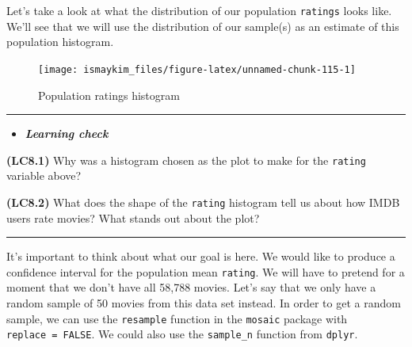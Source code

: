 \documentclass[]{tufte-book}
\newenvironment{Shaded}{\begin{snugshade}}{\end{snugshade}}
\newcommand{\KeywordTok}[1]{\textcolor[rgb]{0.13,0.29,0.53}{\textbf{{#1}}}}
\newcommand{\DataTypeTok}[1]{\textcolor[rgb]{0.13,0.29,0.53}{{#1}}}
\newcommand{\DecValTok}[1]{\textcolor[rgb]{0.00,0.00,0.81}{{#1}}}
\newcommand{\StringTok}[1]{\textcolor[rgb]{0.31,0.60,0.02}{{#1}}}
\newcommand{\NormalTok}[1]{{#1}}
\let\oldrule=\rule
\renewcommand{\rule}[1]{\oldrule{\linewidth}}
\newenvironment{rmdblock}[1]
  {\begin{shaded*}
  \begin{itemize}
  \renewcommand{\labelitemi}{
    \raisebox{-.7\height}[0pt][0pt]{
    }
  }
  \item
  }
  {
  \end{itemize}
  \end{shaded*}
  }
\newenvironment{learncheck}
  {\begin{rmdblock}{warning}}
  {\end{rmdblock}}
\begin{document}
Let's take a look at what the distribution of our population
\texttt{ratings} looks like. We'll see that we will use the distribution
of our sample(s) as an estimate of this population histogram.

\begin{Shaded}
\end{Shaded}

\begin{figure}

{\centering \texttt{[image: ismaykim\_files/figure-latex/unnamed-chunk-115-1]} 

}

\caption[Population ratings histogram]{Population ratings histogram}\label{fig:unnamed-chunk-115}
\end{figure}

\begin{center}\rule{0.5\linewidth}{\linethickness}\end{center}

\begin{learncheck}
\textbf{\emph{Learning check}}
\end{learncheck}

\textbf{(LC8.1)} Why was a histogram chosen as the plot to make for the
\texttt{rating} variable above?

\textbf{(LC8.2)} What does the shape of the \texttt{rating} histogram
tell us about how IMDB users rate movies? What stands out about the
plot?

\begin{center}\rule{0.5\linewidth}{\linethickness}\end{center}

It's important to think about what our goal is here. We would like to
produce a confidence interval for the population mean \texttt{rating}.
We will have to pretend for a moment that we don't have all 58,788
movies. Let's say that we only have a random sample of 50 movies from
this data set instead. In order to get a random sample, we can use the
\texttt{resample} function in the \texttt{mosaic} package with
\texttt{replace\ =\ FALSE}. We could also use the \texttt{sample\_n}
function from \texttt{dplyr}.
\end{document}
